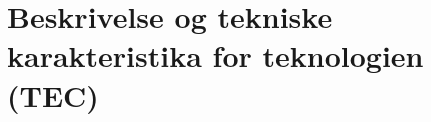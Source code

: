 \chapter{Beskrivelse og tekniske karakteristika for teknologien (TEC)}\vspace{-.75cm} \label{TEC_chap}

%
%
%
\cleardoublepage

\begingroup
\label{litteraturliste}
\raggedright


\endgroup
\begin{appendices}
%	
%	
\end{appendices}


